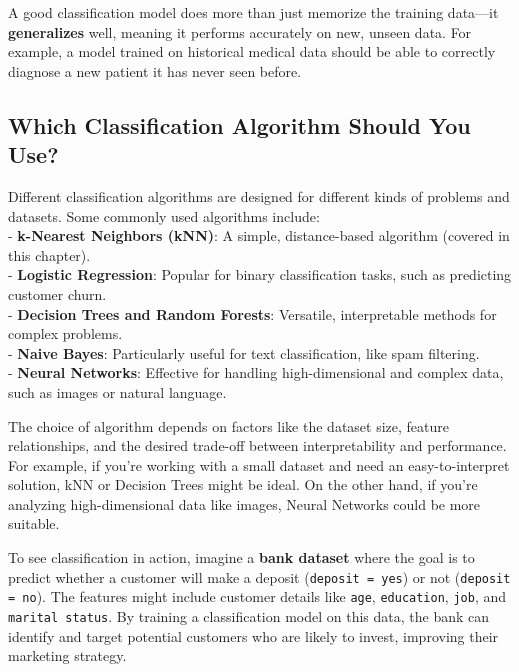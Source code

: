\documentclass[
]{book}
\newcommand{\passthrough}[1]{#1}
\theoremstyle{definition}
\theoremstyle{definition}
\theoremstyle{definition}
\theoremstyle{definition}
\theoremstyle{remark}
\begin{document}
A good classification model does more than just memorize the training data---it \textbf{generalizes} well, meaning it performs accurately on new, unseen data. For example, a model trained on historical medical data should be able to correctly diagnose a new patient it has never seen before.

\subsection*{Which Classification Algorithm Should You Use?}\label{which-classification-algorithm-should-you-use}

Different classification algorithms are designed for different kinds of problems and datasets. Some commonly used algorithms include:\\
- \textbf{k-Nearest Neighbors (kNN)}: A simple, distance-based algorithm (covered in this chapter).\\
- \textbf{Logistic Regression}: Popular for binary classification tasks, such as predicting customer churn.\\
- \textbf{Decision Trees and Random Forests}: Versatile, interpretable methods for complex problems.\\
- \textbf{Naive Bayes}: Particularly useful for text classification, like spam filtering.\\
- \textbf{Neural Networks}: Effective for handling high-dimensional and complex data, such as images or natural language.

The choice of algorithm depends on factors like the dataset size, feature relationships, and the desired trade-off between interpretability and performance. For example, if you're working with a small dataset and need an easy-to-interpret solution, kNN or Decision Trees might be ideal. On the other hand, if you're analyzing high-dimensional data like images, Neural Networks could be more suitable.

To see classification in action, imagine a \textbf{bank dataset} where the goal is to predict whether a customer will make a deposit (\passthrough{\lstinline!deposit = yes!}) or not (\passthrough{\lstinline!deposit = no!}). The features might include customer details like \passthrough{\lstinline!age!}, \passthrough{\lstinline!education!}, \passthrough{\lstinline!job!}, and \passthrough{\lstinline!marital status!}. By training a classification model on this data, the bank can identify and target potential customers who are likely to invest, improving their marketing strategy.
\end{document}
